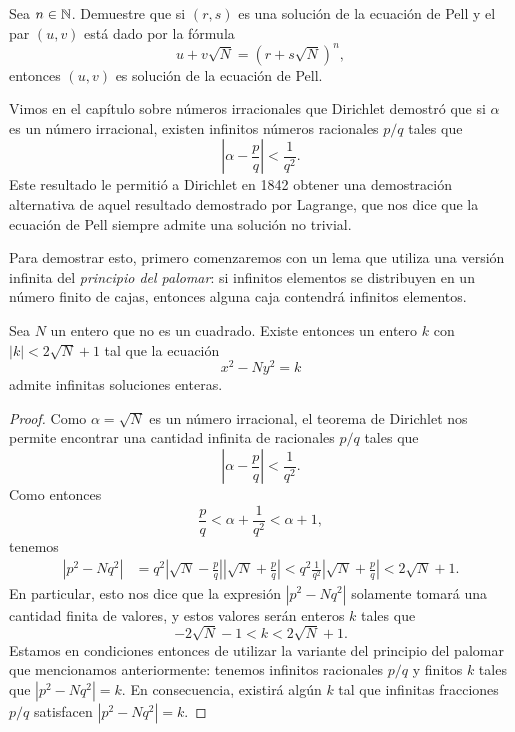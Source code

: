\begin{exercise}
	Sea $n\in\mathbb{N}$.  Demuestre que si $(r,s)$ es una solución de la ecuación de
	Pell y el par $(u,v)$ está dado por la fórmula 
	\[
		u+v\sqrt{N}=(r+s\sqrt{N})^n,
	\]
	entonces $(u,v)$ es solución de la ecuación de Pell.
\end{exercise}

Vimos en el capítulo sobre números irracionales que Dirichlet demostró que si
$\alpha$ es un número irracional, existen infinitos números racionales $p/q$
tales que
\[
	\left|\alpha-\frac{p}{q}\right|<\frac{1}{q^2}.
\]
Este resultado le permitió a Dirichlet en 1842 obtener una demostración
alternativa de aquel resultado demostrado por Lagrange, que nos dice que la
ecuación de Pell siempre admite una solución no trivial. 

Para demostrar esto, primero comenzaremos con un lema que utiliza una versión
infinita del \emph{principio del palomar}: si infinitos elementos se
distribuyen en un número finito de cajas, entonces alguna caja contendrá
infinitos elementos.

\begin{theorem}[Dirichlet]
	Sea $N$ un entero que no es un cuadrado.  Existe entonces un entero $k$ con
	$|k|<2\sqrt{N}+1$ tal que la ecuación 
	\[
		x^2-Ny^2=k
	\]
	admite infinitas soluciones enteras. 
\end{theorem}

\begin{proof}
	Como $\alpha=\sqrt{N}$ es un número irracional, el teorema de Dirichlet nos
	permite encontrar una cantidad infinita de racionales $p/q$ tales que
	\[
		\left|\alpha-\frac{p}{q}\right|<\frac{1}{q^2}.
	\]
	Como entonces 
	\[
		\frac{p}{q}<\alpha+\frac{1}{q^{2}}<\alpha+1,
	\]
	tenemos 
	\begin{align*}
		|p^2-Nq^2|&=q^2\left|\sqrt{N}-\frac{p}{q}\right|\left|\sqrt{N}+\frac{p}{q}\right|
		<q^2\frac{1}{q^2}\left|\sqrt{N}+\frac{p}{q}\right|<2\sqrt{N}+1.
	\end{align*}
	En particular, esto nos dice que la expresión $|p^2-Nq^2|$ solamente tomará
	una cantidad finita de valores, y estos valores serán enteros $k$ tales que
	\[
		-2\sqrt{N}-1<k<2\sqrt{N}+1. 
	\]
	Estamos en condiciones entonces de utilizar la variante del principio del
	palomar que mencionamos anteriormente: tenemos infinitos racionales $p/q$ y
	finitos $k$ tales que $|p^2-Nq^2|=k$. En consecuencia, existirá algún $k$
	tal que infinitas fracciones $p/q$ satisfacen $|p^2-Nq^2|=k$.
\end{proof}

